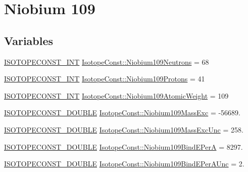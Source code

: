 \hypertarget{group___isotope_const-_niobium-_nb109}{}\section{Niobium 109}
\label{group___isotope_const-_niobium-_nb109}
\subsection*{Variables}
\begin{DoxyCompactItemize}
\item 
\mbox{\hyperlink{group___isotope_const-_macros_ga5f18360b3e99483a35c32d789e62621c}{I\+S\+O\+T\+O\+P\+E\+C\+O\+N\+S\+T\+\_\+\+I\+NT}} \mbox{\hyperlink{group___isotope_const-_niobium-_nb109_gaab54d39e9c6b812b1f35ad6735c1c291}{Isotope\+Const\+::\+Niobium109\+Neutrons}} = 68
\item 
\mbox{\hyperlink{group___isotope_const-_macros_ga5f18360b3e99483a35c32d789e62621c}{I\+S\+O\+T\+O\+P\+E\+C\+O\+N\+S\+T\+\_\+\+I\+NT}} \mbox{\hyperlink{group___isotope_const-_niobium-_nb109_gacfc47091adb8c46056566b0ce2efc900}{Isotope\+Const\+::\+Niobium109\+Protons}} = 41
\item 
\mbox{\hyperlink{group___isotope_const-_macros_ga5f18360b3e99483a35c32d789e62621c}{I\+S\+O\+T\+O\+P\+E\+C\+O\+N\+S\+T\+\_\+\+I\+NT}} \mbox{\hyperlink{group___isotope_const-_niobium-_nb109_ga9fedd3b791d9864b5e30d8f39abb6da5}{Isotope\+Const\+::\+Niobium109\+Atomic\+Weight}} = 109
\item 
\mbox{\hyperlink{group___isotope_const-_macros_ga8f45a7272ce02c0b4c65c44636ed719a}{I\+S\+O\+T\+O\+P\+E\+C\+O\+N\+S\+T\+\_\+\+D\+O\+U\+B\+LE}} \mbox{\hyperlink{group___isotope_const-_niobium-_nb109_gafa2bf1cb8090255db250c88a94fd1216}{Isotope\+Const\+::\+Niobium109\+Mass\+Exc}} = -\/56689.
\item 
\mbox{\hyperlink{group___isotope_const-_macros_ga8f45a7272ce02c0b4c65c44636ed719a}{I\+S\+O\+T\+O\+P\+E\+C\+O\+N\+S\+T\+\_\+\+D\+O\+U\+B\+LE}} \mbox{\hyperlink{group___isotope_const-_niobium-_nb109_ga1063f863f8a7095f349c6580a5ca2925}{Isotope\+Const\+::\+Niobium109\+Mass\+Exc\+Unc}} = 258.
\item 
\mbox{\hyperlink{group___isotope_const-_macros_ga8f45a7272ce02c0b4c65c44636ed719a}{I\+S\+O\+T\+O\+P\+E\+C\+O\+N\+S\+T\+\_\+\+D\+O\+U\+B\+LE}} \mbox{\hyperlink{group___isotope_const-_niobium-_nb109_ga748e2c4e5073587566ef9dd81f6c79b8}{Isotope\+Const\+::\+Niobium109\+Bind\+E\+PerA}} = 8297.
\item 
\mbox{\hyperlink{group___isotope_const-_macros_ga8f45a7272ce02c0b4c65c44636ed719a}{I\+S\+O\+T\+O\+P\+E\+C\+O\+N\+S\+T\+\_\+\+D\+O\+U\+B\+LE}} \mbox{\hyperlink{group___isotope_const-_niobium-_nb109_ga3e74b8f41812502adce0f1e480c73051}{Isotope\+Const\+::\+Niobium109\+Bind\+E\+Per\+A\+Unc}} = 2.

\end{DoxyCompactItemize}
